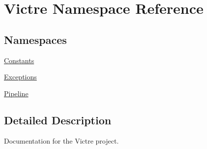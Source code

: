 \hypertarget{namespaceVictre}{\section{Victre Namespace Reference}
\label{namespaceVictre}
}
\subsection*{Namespaces}
\begin{DoxyCompactItemize}
\item 
\hyperlink{namespaceVictre_1_1Constants}{Constants}
\item 
\hyperlink{namespaceVictre_1_1Exceptions}{Exceptions}
\item 
\hyperlink{namespaceVictre_1_1Pipeline}{Pipeline}
\end{DoxyCompactItemize}


\subsection{Detailed Description}
\begin{DoxyVerb}Documentation for the Victre project.
\end{DoxyVerb}
 